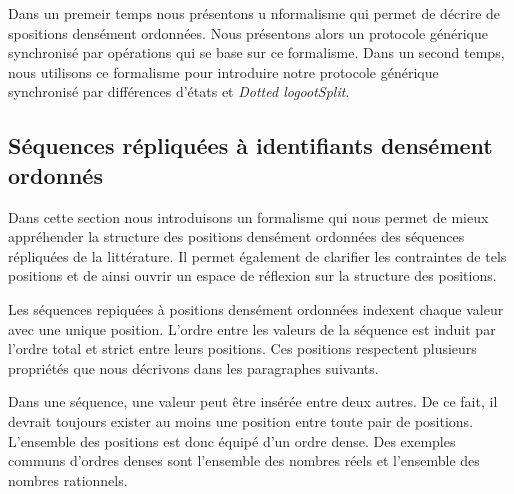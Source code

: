 Dans un premeir temps nous présentons u nformalisme qui permet de décrire de spositions densément ordonnées.
Nous présentons alors un protocole générique synchronisé par opérations qui se base sur ce formalisme.
Dans un second temps, nous utilisons ce formalisme pour introduire notre protocole générique synchronisé par différences d'états et \emph{Dotted logootSplit}.

%


\subsection{Séquences répliquées à identifiants densément ordonnés}\label{subsec:dense-id-seq}

Dans cette section nous introduisons un formalisme qui nous permet de mieux appréhender la structure des positions densément ordonnées des séquences répliquées de la littérature.
Il permet également de clarifier les contraintes de tels positions et de ainsi ouvrir un espace de réflexion sur la structure des positions.

Les séquences repiquées à positions densément ordonnées indexent chaque valeur avec une unique position.
L'ordre entre les valeurs de la séquence est induit par l'ordre total et strict entre leurs positions.
Ces positions respectent plusieurs propriétés que nous décrivons dans les paragraphes suivants.

Dans une séquence, une valeur peut être insérée entre deux autres.
De ce fait, il devrait toujours exister au moins une position entre toute pair de positions.
L'ensemble des positions est donc équipé d'un ordre dense.
Des exemples communs d'ordres denses sont l'ensemble des nombres réels et l'ensemble des nombres rationnels.

